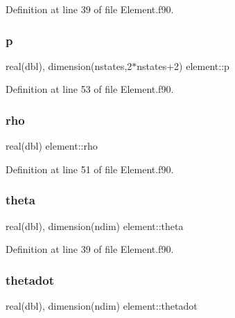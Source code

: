 Definition at line 39 of file Element.\+f90.

\mbox{\label{namespaceelement_abf487a07f5188539bf21883fc0a10c70}} 
\subsubsection{\texorpdfstring{p}{p}}
{\footnotesize\ttfamily real(dbl), dimension(nstates,2$\ast$nstates+2) element\+::p\hspace{0.3cm}{\ttfamily [private]}}



Definition at line 53 of file Element.\+f90.

\mbox{\label{namespaceelement_a3c256e3e6f1a658f469f77ed8f7d033e}} 
\subsubsection{\texorpdfstring{rho}{rho}}
{\footnotesize\ttfamily real(dbl) element\+::rho\hspace{0.3cm}{\ttfamily [private]}}



Definition at line 51 of file Element.\+f90.

\mbox{\label{namespaceelement_ac0a8fcda10d1b0af47fd7d713ebcd5fe}} 
\subsubsection{\texorpdfstring{theta}{theta}}
{\footnotesize\ttfamily real(dbl), dimension(ndim) element\+::theta\hspace{0.3cm}{\ttfamily [private]}}



Definition at line 39 of file Element.\+f90.

\mbox{\label{namespaceelement_a7404d160f35ff4cfc4ea3e3d8f76cb89}} 
\subsubsection{\texorpdfstring{thetadot}{thetadot}}
{\footnotesize\ttfamily real(dbl), dimension(ndim) element\+::thetadot\hspace{0.3cm}{\ttfamily [private]}}



